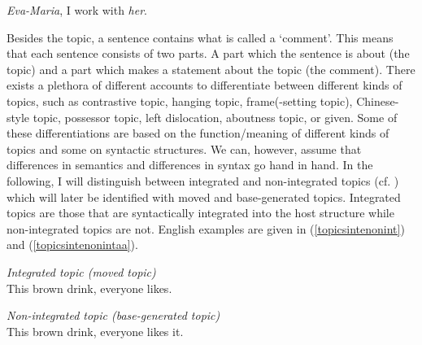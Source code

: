 \begin{exe}
\ex \textit{Eva-Maria}, I work with \textit{her}. \label{ex:topicintro}
\end{exe} 

\noindent Besides the topic, a sentence contains what is called a `comment'. This means that each sentence consists of two parts. A part which the sentence is about (the topic) and a part which makes a statement about the topic (the comment). There exists a plethora of different accounts to differentiate between different kinds of topics, such as contrastive topic, hanging topic, frame(-setting topic), Chinese-style topic, possessor topic, left dislocation, aboutness topic, or given. Some of these differentiations are based on the function/meaning of different kinds of topics and some on syntactic structures. We can, however, assume that differences in semantics and differences in syntax go hand in hand. In the following, I will distinguish between integrated and non-integrated topics (cf. \citealt{shaer2004integrated}) which will later be identified with moved and base-generated topics. Integrated topics are those that are syntactically integrated into the host structure while non-integrated topics are not. English examples are given in (\ref{topicsintenonint}) and (\ref{topicsintenonintaa}).

\begin{exe}
\ex \textit{Integrated topic (moved topic)}\\
This brown drink, everyone likes.   \label{topicsintenonint}
\end{exe}

\begin{exe}
\ex \textit{Non-integrated topic (base-generated topic)}\\
This brown drink, everyone likes it. \label{topicsintenonintaa}
\end{exe}

